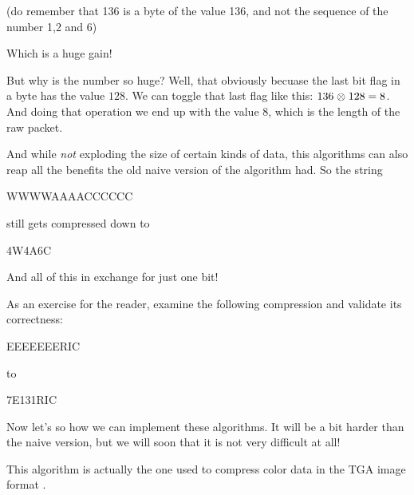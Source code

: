 \begin{refsection}
(do remember that 136 is a byte of the value 136, and not the sequence
of the number 1,2 and 6)

Which is a huge gain!

But why is the number so huge? Well, that obviously becuase the last
bit flag in a byte has the value $128$. We can toggle that last flag
like this: $136 \mathrel{\otimes} 128 = 8$. And doing that operation we end up with
the value $8$, which is the length of the raw packet.


And while \textit{not} exploding the size of certain kinds of data,
this algorithms can also reap all the benefits the old naive version
of the algorithm had. So the string

\begin{indentpar}
  WWWWAAAACCCCCC
\end{indentpar}

still gets compressed down to

\begin{indentpar}
  4W4A6C
\end{indentpar}

And all of this in exchange for just one bit!

As an exercise for the reader, examine the following compression and
validate its correctness:

\begin{indentpar}
  EEEEEEERIC
\end{indentpar}

to

\begin{indentpar}
  7E131RIC
\end{indentpar}

Now let's so how we can implement these algorithms. It will be a bit
harder than the naive version, but we will soon that it is not very
difficult at all!

This algorithm is actually the one used to compress color data in the
TGA image format \cite{91:_truev_tga_file_format_specif}.

\printbibliography[heading=subbibliography]

\end{refsection}